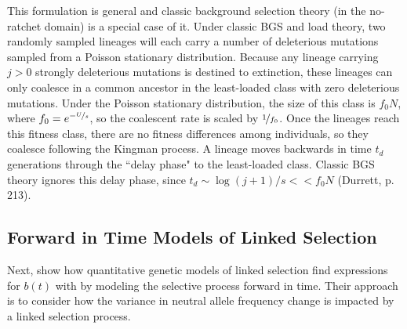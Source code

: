 \documentclass[11pt]{article}
\newcommand{\E}{\mathbb{E}}
\begin{document}
This formulation is general and classic background selection theory (in the
no-ratchet domain) is a special case of it. Under classic BGS and load theory,
two randomly sampled lineages will each carry a number of deleterious mutations
sampled from a Poisson stationary distribution. Because any lineage carrying $j
> 0$ strongly deleterious mutations is destined to extinction, these lineages
can only coalesce in a common ancestor in the least-loaded class with zero
deleterious mutations. Under the Poisson stationary distribution, the size of
this class is $f_0 N$, where $f_0 = e^{-\nicefrac{U}{s}}$, so the coalescent
rate is scaled by $\nicefrac{1}{f_0}$. Once the lineages reach this fitness
class, there are no fitness differences among individuals, so they coalesce
following the Kingman process. A lineage moves backwards in time $t_d$
generations through the ``delay phase" to the least-loaded class. Classic BGS
theory ignores this delay phase, since $t_d \sim \log(j+1)/s << f_0 N$
(Durrett, p. 213). 




\subsection*{Forward in Time Models of Linked Selection}

Next, show how quantitative genetic models of linked selection
\parencite{Robertson1961-ho,Santiago1995-hx,Santiago1998-bs,Santiago2016-mu}
find expressions for $b(t)$ with by modeling the selective process forward in
time. Their approach is to consider how the variance in neutral allele
frequency change is impacted by a linked selection process. 
\end{document}
